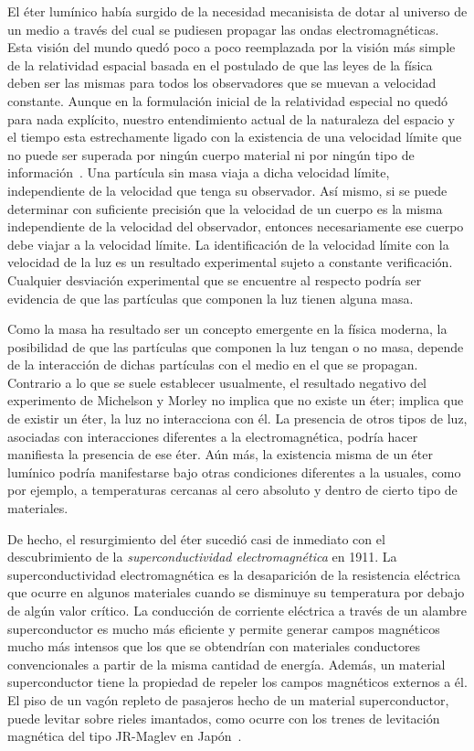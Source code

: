 El éter lumínico había surgido de la necesidad mecanisista de dotar al universo de un medio a través del cual se pudiesen propagar las ondas electromagnéticas. Esta visión del mundo quedó poco a poco reemplazada por la visión más simple de la relatividad espacial basada en el postulado de que las leyes de la física deben ser las mismas para todos los observadores que se muevan a velocidad constante. Aunque en la formulación inicial de la relatividad especial no quedó para nada explícito, nuestro entendimiento actual de la naturaleza del espacio y el tiempo esta estrechamente ligado con la existencia de una velocidad límite que no puede ser superada por ningún cuerpo material ni por ningún tipo de información~\cite{0708.0929}. Una partícula sin masa viaja a dicha velocidad límite, independiente de la velocidad que tenga su observador. Así mismo, si se puede determinar con suficiente precisión que la velocidad de un cuerpo es la misma independiente de la velocidad del observador, entonces necesariamente ese cuerpo debe viajar a la velocidad límite. La identificación de la velocidad límite con la velocidad de la luz es un resultado experimental sujeto a constante verificación. Cualquier desviación experimental que se encuentre al respecto podría ser evidencia de que las partículas que componen la luz tienen alguna masa.

Como la masa ha resultado ser un concepto emergente en la física moderna, la posibilidad de que las partículas que componen la luz tengan o no masa, depende de la interacción de dichas partículas con el medio en el que se propagan. Contrario a lo que se suele establecer usualmente, el resultado negativo del experimento de Michelson y Morley \cite{EMM} no implica que no existe un éter; implica que de existir un éter, la luz no interacciona con él. La presencia de otros tipos de luz, asociadas con interacciones diferentes a la electromagnética, podría hacer manifiesta la presencia de ese éter.  Aún más, la existencia misma de un éter lumínico podría manifestarse bajo otras condiciones diferentes a la usuales, como por ejemplo, a temperaturas cercanas al cero absoluto y dentro de cierto tipo de materiales.

De hecho, el resurgimiento del éter sucedió casi de inmediato con el descubrimiento de la \emph{superconductividad electromagnética} en 1911. La superconductividad electromagnética es la desaparición de la resistencia eléctrica que ocurre en algunos materiales cuando se disminuye su temperatura por debajo de algún valor crítico. La conducción de corriente eléctrica a través de un alambre superconductor es mucho más eficiente y permite generar campos magnéticos mucho más intensos que los que se obtendrían con materiales conductores convencionales a partir de  la misma cantidad de energía. Además, un material superconductor tiene la propiedad de repeler los campos magnéticos externos a él. El piso de un vagón repleto de pasajeros hecho de un material superconductor, puede levitar sobre rieles imantados, como ocurre con los trenes de levitación magnética del tipo JR-Maglev en Japón~\cite{maglev}. 

